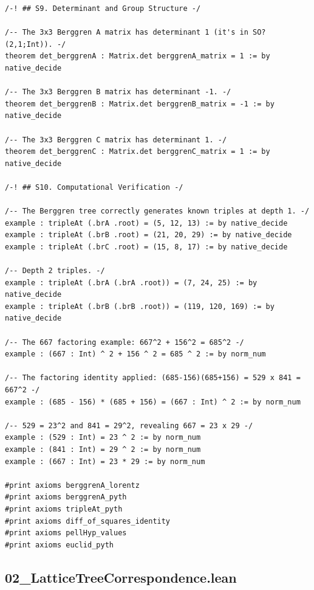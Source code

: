 \documentclass[11pt,openright,twoside]{book}
\theoremstyle{definition}
\begin{document}
\begin{lstlisting}[style=lean]
/-! ## S9. Determinant and Group Structure -/

/-- The 3x3 Berggren A matrix has determinant 1 (it's in SO?(2,1;Int)). -/
theorem det_berggrenA : Matrix.det berggrenA_matrix = 1 := by native_decide

/-- The 3x3 Berggren B matrix has determinant -1. -/
theorem det_berggrenB : Matrix.det berggrenB_matrix = -1 := by native_decide

/-- The 3x3 Berggren C matrix has determinant 1. -/
theorem det_berggrenC : Matrix.det berggrenC_matrix = 1 := by native_decide

/-! ## S10. Computational Verification -/

/-- The Berggren tree correctly generates known triples at depth 1. -/
example : tripleAt (.brA .root) = (5, 12, 13) := by native_decide
example : tripleAt (.brB .root) = (21, 20, 29) := by native_decide
example : tripleAt (.brC .root) = (15, 8, 17) := by native_decide

/-- Depth 2 triples. -/
example : tripleAt (.brA (.brA .root)) = (7, 24, 25) := by native_decide
example : tripleAt (.brB (.brB .root)) = (119, 120, 169) := by native_decide

/-- The 667 factoring example: 667^2 + 156^2 = 685^2 -/
example : (667 : Int) ^ 2 + 156 ^ 2 = 685 ^ 2 := by norm_num

/-- The factoring identity applied: (685-156)(685+156) = 529 x 841 = 667^2 -/
example : (685 - 156) * (685 + 156) = (667 : Int) ^ 2 := by norm_num

/-- 529 = 23^2 and 841 = 29^2, revealing 667 = 23 x 29 -/
example : (529 : Int) = 23 ^ 2 := by norm_num
example : (841 : Int) = 29 ^ 2 := by norm_num
example : (667 : Int) = 23 * 29 := by norm_num

#print axioms berggrenA_lorentz
#print axioms berggrenA_pyth
#print axioms tripleAt_pyth
#print axioms diff_of_squares_identity
#print axioms pellHyp_values
#print axioms euclid_pyth

\end{lstlisting}

\clearpage


\subsection*{02\_LatticeTreeCorrespondence.lean}
\label{lean:02_LatticeTreeCorrespondence}
\end{document}
